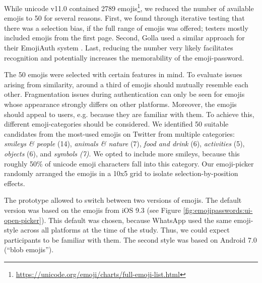 While unicode v11.0 contained 2789 emojis\footnote{\label{foot:full-list-of-emojis}\url{https://unicode.org/emoji/charts/full-emoji-list.html}}, we reduced the number of available emojis to 50 for several reasons. First, we found through iterative testing that there was a selection bias, if the full range of emojis was offered; testers mostly included emojis from the first page. %
Second, Golla \etal used a similar approach for their EmojiAuth system \cite{Golla2017EmojiAuth, Kraus2017Emoji}. Last, reducing the number very likely facilitates recognition and potentially increases the memorability of the emoji-password.

The 50 emojis were selected with certain features in mind. To evaluate issues arising from similarity, around a third of emojis should mutually resemble each other. Fragmentation issues during authentication can only be seen for emojis whose appearance strongly differs on other platforms. Moreover, the emojis should appeal to users, e.g. because they are familiar with them. To achieve this, different emoji-categories should be considered. We identified 50 suitable candidates from the most-used emojis on Twitter from multiple categories: \textit{smileys \& people} (14), \textit{animals \& nature} (7), \textit{food and drink} (6), \textit{activities} (5), \textit{objects} (6), and \textit{symbols (7)}. We opted to include more smileys, because this roughly 50\% of unicode emoji characters fall into this category. Our emoji-picker randomly arranged the emojis in a 10x5 grid to isolate selection-by-position effects. 

The prototype allowed to switch between two versions of emojis. The default version was based on the emojis from iOS 9.3 (see Figure \ref{fig:emojipasswords:ui-open-picker}). This default was chosen, because WhatsApp used the same emoji-style across all platforms at the time of the study. Thus, we could expect participants to be familiar with them. The second style was based on Android 7.0 (``blob emojis''). 

